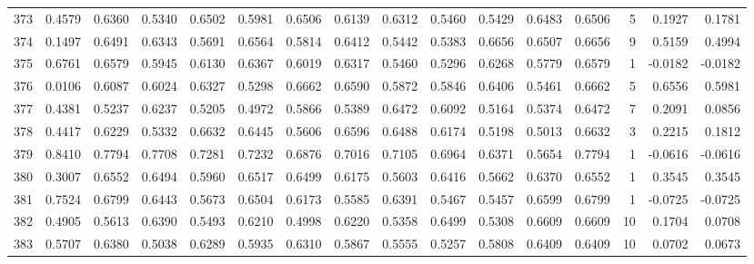 \begin{tabular}{lrrrrrrrrrrrrrrr}
373 &      0.4579 &  0.6360 &  0.5340 &  0.6502 &  0.5981 &  0.6506 &  0.6139 &  0.6312 &  0.5460 &  0.5429 &   0.6483 &     0.6506 &      5 &                    0.1927 &                     0.1781 \\
374 &      0.1497 &  0.6491 &  0.6343 &  0.5691 &  0.6564 &  0.5814 &  0.6412 &  0.5442 &  0.5383 &  0.6656 &   0.6507 &     0.6656 &      9 &                    0.5159 &                     0.4994 \\
375 &      0.6761 &  0.6579 &  0.5945 &  0.6130 &  0.6367 &  0.6019 &  0.6317 &  0.5460 &  0.5296 &  0.6268 &   0.5779 &     0.6579 &      1 &                   -0.0182 &                    -0.0182 \\
376 &      0.0106 &  0.6087 &  0.6024 &  0.6327 &  0.5298 &  0.6662 &  0.6590 &  0.5872 &  0.5846 &  0.6406 &   0.5461 &     0.6662 &      5 &                    0.6556 &                     0.5981 \\
377 &      0.4381 &  0.5237 &  0.6237 &  0.5205 &  0.4972 &  0.5866 &  0.5389 &  0.6472 &  0.6092 &  0.5164 &   0.5374 &     0.6472 &      7 &                    0.2091 &                     0.0856 \\
378 &      0.4417 &  0.6229 &  0.5332 &  0.6632 &  0.6445 &  0.5606 &  0.6596 &  0.6488 &  0.6174 &  0.5198 &   0.5013 &     0.6632 &      3 &                    0.2215 &                     0.1812 \\
379 &      0.8410 &  0.7794 &  0.7708 &  0.7281 &  0.7232 &  0.6876 &  0.7016 &  0.7105 &  0.6964 &  0.6371 &   0.5654 &     0.7794 &      1 &                   -0.0616 &                    -0.0616 \\
380 &      0.3007 &  0.6552 &  0.6494 &  0.5960 &  0.6517 &  0.6499 &  0.6175 &  0.5603 &  0.6416 &  0.5662 &   0.6370 &     0.6552 &      1 &                    0.3545 &                     0.3545 \\
381 &      0.7524 &  0.6799 &  0.6443 &  0.5673 &  0.6504 &  0.6173 &  0.5585 &  0.6391 &  0.5467 &  0.5457 &   0.6599 &     0.6799 &      1 &                   -0.0725 &                    -0.0725 \\
382 &      0.4905 &  0.5613 &  0.6390 &  0.5493 &  0.6210 &  0.4998 &  0.6220 &  0.5358 &  0.6499 &  0.5308 &   0.6609 &     0.6609 &     10 &                    0.1704 &                     0.0708 \\
383 &      0.5707 &  0.6380 &  0.5038 &  0.6289 &  0.5935 &  0.6310 &  0.5867 &  0.5555 &  0.5257 &  0.5808 &   0.6409 &     0.6409 &     10 &                    0.0702 &                     0.0673 \\

\end{tabular}

